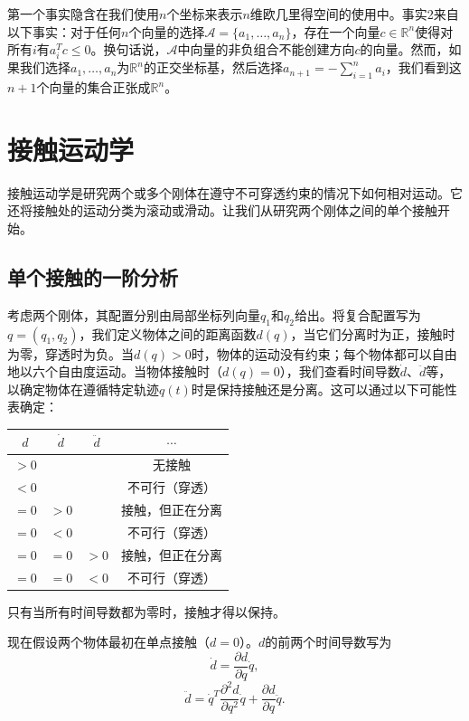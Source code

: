 \documentclass[12pt,a4paper]{article}
\begin{document}
第一个事实隐含在我们使用$n$个坐标来表示$n$维欧几里得空间的使用中。事实2来自以下事实：对于任何$n$个向量的选择$\mathcal{A} = \{a_1, \ldots, a_n\}$，存在一个向量$c \in \mathbb{R}^n$使得对所有$i$有$a_i^T c \leq 0$。换句话说，$\mathcal{A}$中向量的非负组合不能创建方向$c$的向量。然而，如果我们选择$a_1, \ldots, a_n$为$\mathbb{R}^n$的正交坐标基，然后选择$a_{n+1} = -\sum_{i=1}^n a_i$，我们看到这$n + 1$个向量的集合正张成$\mathbb{R}^n$。

\section{接触运动学}
\label{sec:contact_kinematics}

接触运动学是研究两个或多个刚体在遵守不可穿透约束的情况下如何相对运动。它还将接触处的运动分类为滚动或滑动。让我们从研究两个刚体之间的单个接触开始。

\subsection{单个接触的一阶分析}
\label{subsec:first_order_analysis}

考虑两个刚体，其配置分别由局部坐标列向量$q_1$和$q_2$给出。将复合配置写为$q = (q_1, q_2)$，我们定义物体之间的距离函数$d(q)$，当它们分离时为正，接触时为零，穿透时为负。当$d(q) > 0$时，物体的运动没有约束；每个物体都可以自由地以六个自由度运动。当物体接触时（$d(q) = 0$），我们查看时间导数$\dot{d}$、$\ddot{d}$等，以确定物体在遵循特定轨迹$q(t)$时是保持接触还是分离。这可以通过以下可能性表确定：

\begin{center}
\begin{tabular}{|c|c|c|c|}
\hline
$d$ & $\dot{d}$ & $\ddot{d}$ & $\cdots$ \\
\hline
$>0$ & & & 无接触 \\
$<0$ & & & 不可行（穿透） \\
$=0$ & $>0$ & & 接触，但正在分离 \\
$=0$ & $<0$ & & 不可行（穿透） \\
$=0$ & $=0$ & $>0$ & 接触，但正在分离 \\
$=0$ & $=0$ & $<0$ & 不可行（穿透） \\
\hline
\end{tabular}
\end{center}

只有当所有时间导数都为零时，接触才得以保持。

现在假设两个物体最初在单点接触（$d = 0$）。$d$的前两个时间导数写为
\begin{equation}
\dot{d} = \frac{\partial d}{\partial q} \dot{q},
\label{eq:12.1}
\end{equation}
\begin{equation}
\ddot{d} = \dot{q}^T \frac{\partial^2 d}{\partial q^2} \dot{q} + \frac{\partial d}{\partial q} \ddot{q}.
\label{eq:12.2}
\end{equation}
\end{document}

